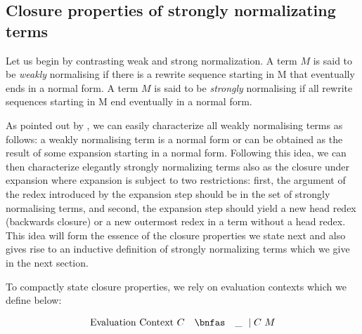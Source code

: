 \documentclass{article}
\begin{document}
\subsection*{Closure properties of strongly normalizating terms}


Let us begin by contrasting weak and strong normalization. A term $M$ is said to be \emph{weakly} normalising if there is a  rewrite sequence starting in M that eventually ends in a  normal form. A  term $M$ is said to be \emph{strongly} normalising if all rewrite sequences starting in M end eventually in a  normal form.

As pointed out by \cite{Raamsdonk_onnormalisation}, we can easily characterize all weakly normalising terms as follows: a  weakly normalising term is a normal form or can be obtained as the result of some expansion starting in a  normal form. Following this idea, we can then characterize elegantly strongly normalizing terms also as the closure under expansion where expansion is subject to two restrictions: first, the argument of the redex introduced by the expansion step should be in the set of strongly normalising terms, and second, the expansion step should yield a new head redex (backwards closure) or a  new outermost redex in a  term without a  head redex. This idea will form the essence of the closure properties we state next and also gives rise to an inductive definition of strongly normalizing terms which we give in the next section.

To compactly state closure properties, we rely on evaluation contexts which we define below:

\[
\begin{array}{lcl}
\mbox{Evaluation Context}~C & \bnfas & {\_} ~\mid C~M
\end{array}
\]
\end{document}
